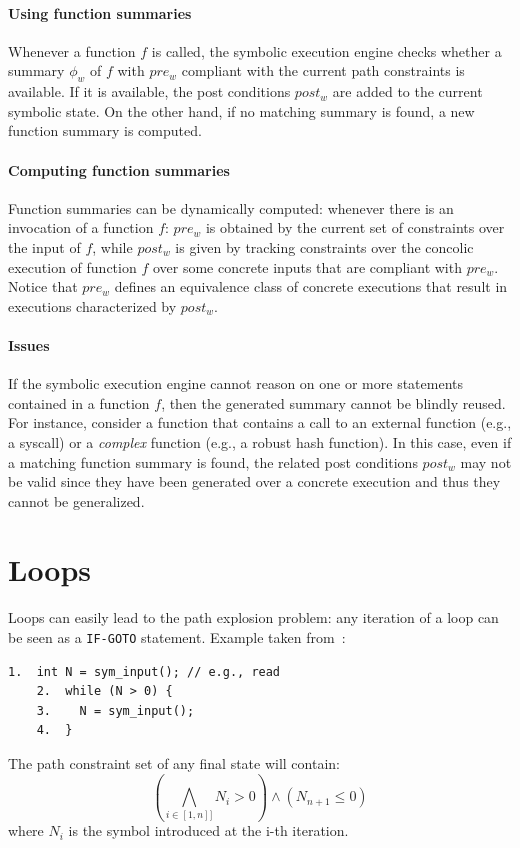 \paragraph{Using function summaries} Whenever a function $f$ is called, the symbolic execution engine checks whether a summary $\phi_w$ of $f$ with $pre_w$ compliant with the current path constraints is available. If it is available, the post conditions $post_w$ are added to the current symbolic state. On the other hand, if no matching summary is found, a new function summary is computed.

\paragraph{Computing function summaries} Function summaries can be dynamically computed: whenever there is an invocation of a function $f$: $pre_w$ is obtained by the current set of constraints over the input of $f$, while $post_w$ is given by tracking constraints over the concolic execution of function $f$ over some concrete inputs that are compliant with $pre_w$. Notice that $pre_w$ defines an equivalence class of concrete executions that result in executions characterized by $post_w$. 

\paragraph{Issues} If the symbolic execution engine cannot reason on one or more statements contained in a function $f$, then the generated summary cannot be blindly reused. For instance, consider a function that contains a call to an external function (e.g., a syscall) or a {\em complex} function (e.g., a robust hash function). In this case, even if a matching function summary is found, the related post conditions $post_w$ may not be valid since they have been generated over a concrete execution and thus they cannot be generalized.




\section{Loops}
\label{se:loops}

Loops can easily lead to the path explosion problem: any iteration of a loop can be seen as a {\tt IF-GOTO} statement. Example taken from~\cite{CS-CACM13}:
    \begin{lstlisting}[basicstyle=\ttfamily\small]
    1.  int N = sym_input(); // e.g., read
    2.  while (N > 0) {
    3.    N = sym_input();  
    4.  }
    \end{lstlisting}
The path constraint set of any final state will contain:
  \[ \left ( \bigwedge_{i \in [1, n]]} N_i > 0 \right ) \wedge (N_{n+1} \leq 0) \]
where $N_i$ is the symbol introduced at the i-th iteration.\\

